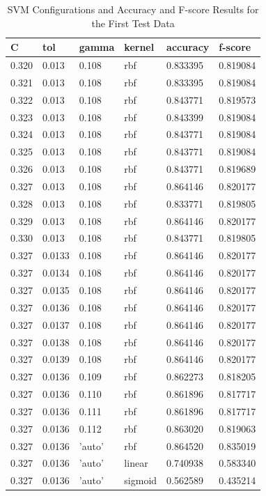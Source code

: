 \documentclass[conference]{IEEEtran}
\begin{document}
\begin{table}[H]
	\centering
	\caption{SVM Configurations and Accuracy and F-score Results for the First Test Data}
	\label{AllArches}
	\begin{tabular}{|l|l|l|l|l|l|}
		\hline
		C
		& tol
		& gamma
		& kernel
		& accuracy
		& f-score\\ \hline
		0.320 & 0.013 & 0.108 & rbf & 0.833395 & 0.819084\\ \hline
		0.321 & 0.013 & 0.108 & rbf & 0.833395 & 0.819084\\ \hline
		0.322 & 0.013 & 0.108 & rbf & 0.843771 & 0.819573\\ \hline
		0.323 & 0.013 & 0.108 & rbf & 0.843399 & 0.819084\\ \hline
		0.324 & 0.013 & 0.108 & rbf & 0.843771 & 0.819084\\ \hline
		0.325 & 0.013 & 0.108 & rbf & 0.843771 & 0.819084\\ \hline
		0.326 & 0.013 & 0.108 & rbf & 0.843771 & 0.819689\\ \hline
		0.327 & 0.013 & 0.108 & rbf & 0.864146 & 0.820177\\ \hline
		0.328 & 0.013 & 0.108 & rbf & 0.833771 & 0.819805\\ \hline
		0.329 & 0.013 & 0.108 & rbf & 0.864146 & 0.820177\\ \hline
		0.330 & 0.013 & 0.108 & rbf & 0.843771 & 0.819805\\ \hline
		0.327 & 0.0133 & 0.108 & rbf & 0.864146 & 0.820177\\ \hline
		0.327 & 0.0134 & 0.108 & rbf & 0.864146 & 0.820177\\ \hline
		0.327 & 0.0135 & 0.108 & rbf & 0.864146 & 0.820177\\ \hline
		0.327 & 0.0136 & 0.108 & rbf & 0.864146 & 0.820177\\ \hline
		0.327 & 0.0137 & 0.108 & rbf & 0.864146 & 0.820177\\ \hline 
		0.327 & 0.0138 & 0.108 & rbf & 0.864146 & 0.820177\\ \hline
		0.327 & 0.0139 & 0.108 & rbf & 0.864146 & 0.820177\\ \hline 
		0.327 & 0.0136 & 0.109 & rbf & 0.862273 & 0.818205\\ \hline
		0.327 & 0.0136 & 0.110 & rbf & 0.861896 & 0.817717\\ \hline
		0.327 & 0.0136 & 0.111 & rbf & 0.861896 & 0.817717\\ \hline
		0.327 & 0.0136 & 0.112 & rbf & 0.863020 & 0.819063\\ \hline
		0.327 & 0.0136 & 'auto' & rbf & \cellcolor{green!25}0.864520 & \cellcolor{green!25}0.835019\\ \hline
		0.327 & 0.0136 & 'auto' & linear & 0.740938 & 0.583340\\ \hline
		0.327 & 0.0136 & 'auto' & sigmoid & 0.562589 & 0.435214\\ \hline
	\end{tabular}
\end{table}
\end{document}

